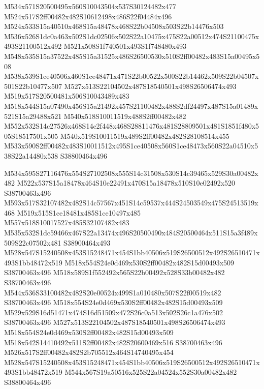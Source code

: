 \documentclass{article}
\begin{document}
\begin{multicols}{2}

M534x571S20500495x560S10043504x537S30124482x477 M524x517S2ff00482x482S10612498x486S22f04484x496 M524x533S15a40510x468S15a48478x468S22b04508x503S22b14476x503 M536x526S1dc0a463x502S1dc02506x502S22a10475x475S22a00512x474S21100475x493S21100512x492 M521x508S1f740501x493S1f748480x493 M548x535S15a37522x485S15a31525x486S26500530x510S2ff00482x483S15a00495x508 M538x539S1ce40506x460S1ce48471x471S22b00522x500S22b14462x509S22b04507x501S22b10477x507 M527x513S22104502x487S18540501x498S26506474x493 M519x517S20500481x506S10043489x483 M518x544S15a07490x456S15a21492x457S21100482x488S2df24497x487S15a01489x521S15a29488x521 M540x518S10011519x488S2ff00482x482 M552x532S14c27526x468S14c2f448x468S28811476x481S28809501x481S1851f480x505S18517501x505 M540x519S10011519x489S2ff00482x482S28108514x455 M533x590S2ff00482x483S10011512x495S1ce40508x560S1ce48473x560S22a04510x538S22a14480x538 S38800464x496

M534x595S27116476x554S27102508x555S14c31508x530S14c39465x529S30a00482x482 M522x537S15a18478x464S10e22491x470S15a18478x510S10e02492x520 S38700463x496 M593x517S32107482x482S14c57567x451S14c59537x444S24503549x475S24513519x468 M519x515S1ce18481x485S1ce10497x485 M557x518S10017527x485S32107482x483 M535x532S1dc59466x467S22a13474x496S20500490x484S20500464x511S15a3f489x509S22c07502x481 S38900464x493 M528x547S15240508x453S15248471x454S1bb40506x519S26500512x492S26510471x493S1bb48472x519 M518x554S24e0d469x530S2ff00482x482S15d00493x509 S38700463x496 M518x589S1f552492x565S22b00492x528S33b00482x482 S38700463x496 M544x536S33100482x482S20e00524x499S1a010480x507S22f00519x482 S38700463x496 M518x554S24e0d469x530S2ff00482x482S15d00493x509 M529x529S16d51471x474S16d51509x472S26c0a513x502S26c1a476x502 S38700463x496 M527x513S22104502x487S18540501x498S26506474x493 M518x554S24e0d469x530S2ff00482x482S15d00493x509 M518x542S14410492x511S2ff00482x482S20600469x516 S38700463x496 M526x517S2ff00482x482S2b705512x464S14740495x454 M528x547S15240508x453S15248471x454S1bb40506x519S26500512x492S26510471x493S1bb48472x519 M544x567S19a50516x525S22a04524x552S30a00482x482 S38800464x496


\end{multicols}
\end{document}

